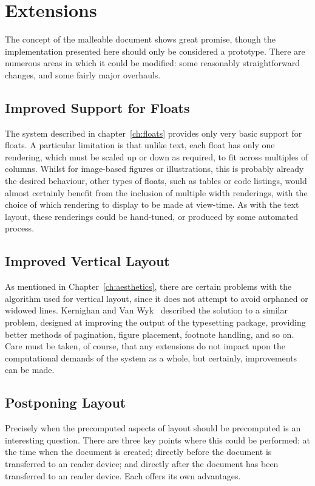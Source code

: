 \section{Extensions}
The concept of the malleable document shows great promise, though the implementation presented here should only be considered a prototype. There are numerous areas in which it could be modified: some reasonably straightforward changes, and some fairly major overhauls.

\subsection{Improved Support for Floats}
The system described in chapter~\ref{ch:floats} provides only very basic support for floats. A particular limitation is that unlike text, each float has only one rendering, which must be scaled up or down as required, to fit across multiples of columns. Whilst for image-based figures or illustrations, this is probably already the desired behaviour, other types of floats, such as tables or code listings, would almost certainly benefit from the inclusion of multiple width renderings, with the choice of which rendering to display to be made at view-time. As with the text layout, these renderings could be hand-tuned, or produced by some automated process. 

\subsection{Improved Vertical Layout}
As mentioned in Chapter~\ref{ch:aesthetics}, there are certain problems with the algorithm used for vertical layout, since it does not attempt to avoid orphaned or widowed lines. Kernighan and Van Wyk~\cite{Kernighan1989} described the solution to a similar problem, designed at improving the output of the \troff{} typesetting package, providing better methods of pagination, figure placement, footnote handling, and so on. Care must be taken, of course, that any extensions do not impact upon the computational demands of the system as a whole, but certainly, improvements can be made.


\subsection{Postponing Layout}
\label{sec:postponing}
Precisely when the precomputed aspects of layout should be precomputed is an interesting question. There are three key points where this could be performed: at the time when the document is created; directly before the document is transferred to an \ebook{} reader device; and directly after the document has been transferred to an \ebook{} reader device. Each offers its own advantages.

